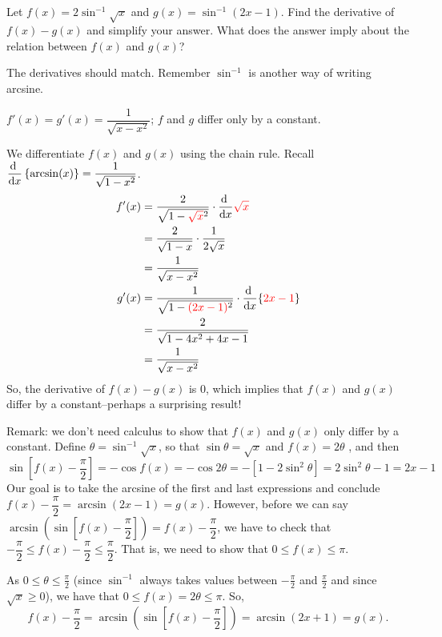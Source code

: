 \subsection*{\Application}


\begin{question}[1999H]
Let $f(x)=2\sin^{-1}\sqrt{x}$ and $g(x)=\sin^{-1}(2x-1)$.
Find the derivative of $f(x)-g(x)$ and simplify your answer. What does
the answer imply about the relation between $f(x)$ and $g(x)$?
\end{question}
\begin{hint}
The derivatives should match. Remember $\sin^{-1}$ is another way of writing arcsine.
\end{hint}
\begin{answer}
$f'(x)=g'(x)=\dfrac{1}{\sqrt{x-x^2}}$; $f$ and $g$ differ only by a constant.
\end{answer}
\begin{solution}
We differentiate $f(x)$ and $g(x)$ using the chain rule. Recall $\ds\diff{}{x}\left\{\arcsin(x)\right\}=\dfrac{1}{\sqrt{1-x^2}}$.
\begin{align*}
f'(x)&=\frac{2}{\sqrt{1-\textcolor{red}{\sqrt{x}}^2}}\cdot\diff{}{x}\textcolor{red}{\sqrt{x}}\\
&=\frac{2}{\sqrt{1-x}}\cdot\frac{1}{2\sqrt{x}}\\
&=\frac{1}{\sqrt{x-x^2}}\cr
g'(x)&=\frac{1}{\sqrt{1-\textcolor{red}{(2x-1)}^2}}\cdot\diff{}{x}\{\textcolor{red}{2x-1}\}\\
&=\frac{2}{\sqrt{1-4x^2+4x-1}}\\
&=\frac{1}{\sqrt{x-x^2}}\cr
\end{align*}
So, the derivative of $f(x)-g(x)$ is $0$, which implies that
$f(x)$ and $g(x)$ differ by a constant--perhaps a surprising result!

Remark: we don't need calculus to show that $f(x)$ and $g(x)$ only differ by a constant. Define
$\theta=\sin^{-1}\sqrt{x}$, so that $\sin\theta=\sqrt{x}$ and $f(x) = 2\theta$ , and then
$$
\sin \left[f(x)-\frac{\pi}{2}\right]=-\cos f(x) =-\cos 2\theta=-[1-2\sin^2\theta]
=2\sin^2\theta -1=2x-1
$$
Our goal is to take the arcsine of the first and last expressions and conclude $f(x)-\dfrac{\pi}{2}=\arcsin(2x-1)=g(x)$. However, before we can say $\arcsin\left(\sin\left[f(x)-\dfrac{\pi}{2}\right]\right)=f(x)-\dfrac{\pi}{2}$, we have to check that $-\dfrac{\pi}{2} \leq f(x)-\dfrac{\pi}{2}\leq\dfrac{\pi}{2}$. That is, we need to show that $0 \leq f(x) \leq \pi$.

 As  $0\le\theta\le\frac{\pi}{2}$
(since $\sin^{-1}$ always takes values between
$-\frac{\pi}{2}$ and $\frac{\pi}{2}$ and since $\sqrt{x}\ge 0$),
we have that $0\le f(x)=2\theta\le \pi$. So,
\[f(x)-\dfrac{\pi}{2}=\arcsin\left(\sin\left[f(x)-\dfrac{\pi}{2}\right]\right)=\arcsin(2x+1)=g(x).\]
\end{solution}



